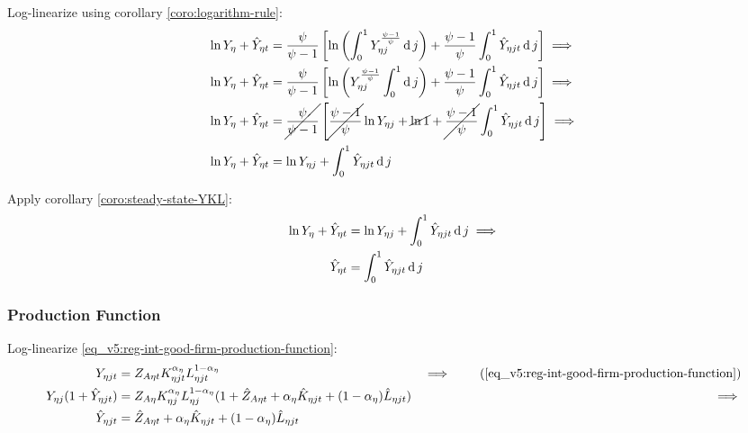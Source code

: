 \documentclass[../thesis.tex]{subfiles}
\begin{document}
Log-linearize using corollary \ref{coro:logarithm-rule}:
\begin{align}
	\ln{Y_{\eta}} + \hat{Y}_{\eta t} &= \frac{\psi}{\psi-1} \left[ \ln \left( \int_{0}^{1} Y_{\eta j}^{\frac{\psi-1}{\psi}} \operatorname{d} j \right) + \frac{\psi-1}{\psi} \int_{0}^{1} \hat{Y}_{\eta jt} \operatorname{d} j \right] \implies \nonumber
	\\
	\ln{Y_{\eta}} + \hat{Y}_{\eta t} &= \frac{\psi}{\psi-1} \left[ \ln \left( Y_{\eta j}^{\frac{\psi-1}{\psi}} \int_{0}^{1} \operatorname{d} j \right) + \frac{\psi-1}{\psi} \int_{0}^{1} \hat{Y}_{\eta jt} \operatorname{d} j \right] \implies \nonumber
	\\
	\ln{Y_{\eta}} + \hat{Y}_{\eta t} &= \cancel{\frac{\psi}{\psi-1}} \left[ \cancel{\frac{\psi-1}{\psi}} \ln{Y_{\eta j}} + \cancel{\ln1} + \cancel{\frac{\psi-1}{\psi}} \int_{0}^{1} \hat{Y}_{\eta jt} \operatorname{d} j \right] \implies \nonumber
	\\
	\ln{Y_{\eta}} + \hat{Y}_{\eta t} &= \ln{Y_{\eta j}} + \int_{0}^{1} \hat{Y}_{\eta jt} \operatorname{d} j \nonumber
\end{align}

Apply corollary \ref{coro:steady-state-YKL}:
\begin{align}
	\ln{Y_{\eta}} + \hat{Y}_{\eta t} &= \ln{Y_{\eta j}} + \int_{0}^{1} \hat{Y}_{\eta jt} \operatorname{d} j \implies \nonumber \\
	\hat{Y}_{\eta t} &= \int_{0}^{1} \hat{Y}_{\eta jt} \operatorname{d} j 
	\label{eq_v5:reg-ll-final-goods-firm-bundle-rule}
\end{align}


\subsubsection*{Production Function}

Log-linearize \ref{eq_v5:reg-int-good-firm-production-function}:
\begin{alignat}{2}
	Y_{\eta jt} &= Z_{A\eta t} K_{\eta jt}^{\alpha_{\eta}} L_{\eta jt}^{1-\alpha_{\eta}} &\implies \tag{\ref{eq_v5:reg-int-good-firm-production-function}} \\
	Y_{\eta j} (1+ \hat{Y}_{\eta jt}) &= Z_{A\eta} K_{\eta j}^{\alpha_{\eta}} L_{\eta j}^{1-\alpha_{\eta}} (1+ \hat{Z}_{A\eta t} + {\alpha_{\eta}} \hat{K}_{\eta jt} + (1-\alpha_{\eta}) \hat{L}_{\eta jt}) &\implies \nonumber \\
	\hat{Y}_{\eta jt} &= \hat{Z}_{A\eta t} + {\alpha_{\eta}} \hat{K}_{\eta jt} + (1-\alpha_{\eta}) \hat{L}_{\eta jt} \label{eq_v5:reg-ll-int-good-firm-production-function}
\end{alignat}
\end{document}
